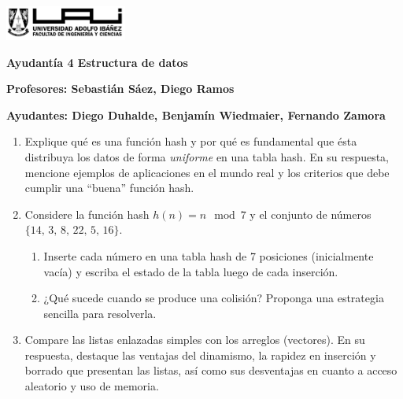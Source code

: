 \documentclass[12pt]{article}
\begin{document}
    \begin{titlepage}
        \centering
        \includegraphics[width=0.3\textwidth]{../imgs/logo-uai-fic.png}
        
        \vspace{0.5cm}
        \textbf{\fontsize{12}{24} Ayudantía 4 Estructura de datos}
        
        \vspace{0.5cm}
        \textbf{\fontsize{12}{24}\selectfont Profesores: Sebastián Sáez, Diego Ramos}
        
        \begin{center}
            \textbf{\fontsize{12}{24}\selectfont Ayudantes: Diego Duhalde, Benjamín Wiedmaier, Fernando Zamora}
        \end{center}

        \begin{enumerate}
            \item Explique qué es una función hash y por qué es fundamental que ésta distribuya los datos de forma \emph{uniforme} en una tabla hash. En su respuesta, mencione ejemplos de aplicaciones en el mundo real y los criterios que debe cumplir una “buena” función hash.
            
            \item Considere la función hash \( h(n) = n \mod 7 \) y el conjunto de números \(\{14,\, 3,\, 8,\, 22,\, 5,\, 16\}\).  
            \begin{enumerate}[label=\alph*.]
                \item Inserte cada número en una tabla hash de 7 posiciones (inicialmente vacía) y escriba el estado de la tabla luego de cada inserción.
                \item ¿Qué sucede cuando se produce una colisión? Proponga una estrategia sencilla para resolverla.
            \end{enumerate}
            
            \item Compare las listas enlazadas simples con los arreglos (vectores). En su respuesta, destaque las ventajas del dinamismo, la rapidez en inserción y borrado que presentan las listas, así como sus desventajas en cuanto a acceso aleatorio y uso de memoria.
            

\end{enumerate}
\end{titlepage}
\end{document}
